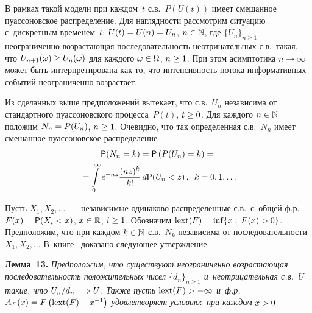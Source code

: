 \begin{multicols}{2}
В рамках такой модели при каждом~$t$ с.в.~$P(U(t))$ имеет смешанное
пуассоновское распределение. Для наглядности рассмотрим ситуацию 
с~дискретным временем~$t$: $U(t)\hm=U(n)\hm=U_n$, $n\hm\in\mathbb{N}$, где
$\{U_n\}_{n\ge1}$~--- неограниченно возрастающая последовательность
неотрицательных с.в.\ такая, что $U_{n+1}(\omega)\hm\ge U_{n}(\omega)$
для каждого $\omega\hm\in\Omega$, $n\hm\ge1$. При этом асимптотика
$n\to\infty$ может быть интерпретирована как то, что интенсивность
потока информативных событий неограниченно возрастает.

Из сделанных выше предположений вытекает, что с.в.~$U_n$ независима
от стандартного пуассоновского процесса~$P(t)$, $t\hm\ge0$. Для каждого
$n\hm\in\mathbb{N}$ положим $N_n\hm=P(U_n)$, $n\hm\ge1$. Очевидно, что так
определенная с.в.~$N_n$ имеет смешанное пуассоновское распределение
\begin{multline*}
{\sf P}(N_n=k)={\sf P}\left(P(U_n)=k\right)={}\\
{}=\int\limits_{0}^{\infty}
e^{-nz}\displaystyle\frac{\displaystyle (nz)^k\mathstrut}{\displaystyle k!\mathstrut}\,d{\sf P}(U_n<z)\,,\enskip
 k=0,1,\ldots
\end{multline*}

Пусть $X_1,X_2,\ldots $~--- независимые одинаково распределенные с.в.\ 
с~общей ф.р.\ $F(x)\hm={\sf P}(X_i\hm<x)$, $x\hm\in\mathbb{R}$, $i\hm\ge1$.
Обозначим $\mathrm{lext}(F)\hm=\inf\{x:\,F(x)>0\}$. Предположим, что
при\linebreak
 каждом $k\hm\in\mathbb{N}$ с.в.~$N_k$ независима от
последовательности $X_1,X_2,\ldots$ В~книге~\cite{KorolevSokolov2008} 
доказано сле\-ду\-ющее утверждение.

\smallskip

\noindent
\textbf{Лемма~13.} \textit{Предположим, что
существуют неограниченно возрастающая последовательность
положительных чисел $\{d_n\}_{n\ge1}$ и~неотрицательная с.в.~$U$
такие, что $U_n/d_n\hm\Longrightarrow U$. Также пусть $\mathrm{lext}
(F)\hm>-\infty$ и~ф.р.\ $A_F(x)\hm=F\left( \mathrm{lext}
(F)\hm-x^{-1}\right)$ удовлетворяет условию$:$ при каждом} $x\hm>0$


\end{multicols}
